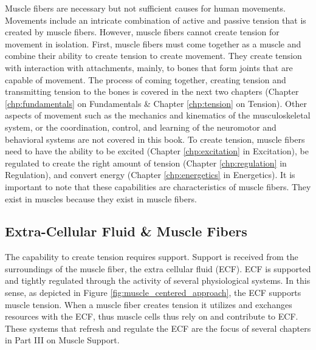 Muscle fibers are necessary but not sufficient causes for human movements. Movements include an intricate combination of active and passive tension that is created by muscle fibers. However, muscle fibers cannot create tension for movement in isolation.  First, muscle fibers must come together as a muscle and combine their ability to create tension to create movement. They create tension with interaction with attachments, mainly, to bones\footnotemark{} that form joints that are capable of movement. The process of coming together, creating tension and transmitting tension to the bones is covered in the next two chapters (Chapter \ref{chp:fundamentals} on Fundamentals \& Chapter \ref{chp:tension} on Tension). Other aspects of movement such as the mechanics and kinematics of the musculoskeletal system, or the coordination, control, and learning of the neuromotor and behavioral systems are not covered in this book. To create tension, muscle fibers need to have the ability to be excited (Chapter \ref{chp:excitation} in Excitation), be regulated to create the right amount of tension (Chapter \ref{chp:regulation} in Regulation), and convert energy (Chapter \ref{chp:energetics} in Energetics). It is important to note that these capabilities are characteristics of muscle fibers. They exist in muscles because they exist in muscle fibers.

\subsection{Extra-Cellular Fluid \& Muscle Fibers}

The capability to create tension requires support. Support is received from the surroundings of the muscle fiber, the extra cellular fluid (ECF). ECF is supported and tightly regulated through the activity of several physiological systems. In this sense, as depicted in Figure \ref{fig:muscle_centered_approach}, the ECF supports muscle tension.\footnotemark{} When a muscle fiber creates tension it utilizes and exchanges resources with the ECF, thus muscle cells thus rely on and contribute to ECF. These systems that refresh and regulate the ECF are the focus of several chapters in Part III on Muscle Support.

